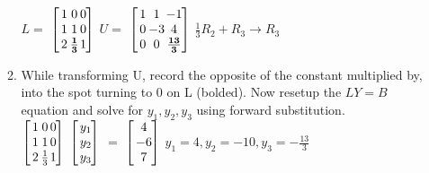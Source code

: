 \documentclass[fontsize=5pt]{scrartcl}
\makeatletter
\newenvironment{tmatrix3}%
{ 
  $\left[\hspace{-3.5pt}\begin{array}{c@{\hspace{1pt}}@{\hspace{1pt}}c@{\hspace{1pt}}c@{\hspace{3pt}}}
}%
{
   \end{array}\hspace{-3.5pt}\right]$
}
\newenvironment{tmatrix1}%
{ 
  $\left[\hspace{-3.5pt}\begin{array}{c@{\hspace{3pt}}}
}%
{
   \end{array}\hspace{-3.5pt}\right]$
}
\makeatother
\begin{document}
\begin{multicols}{3}
\begin{enumerate}
\begin{enumerate}
            $L=$ %
            \begin{tmatrix3}
             1 & 0 & 0 \\
             1 & 1 & 0 \\ 
             2 & \mathbf{\frac{1}{3}} & 1 \\
            \end{tmatrix3}%
            \vline\hspace{2pt}%
            $U=$
            \begin{tmatrix3}
              1 & 1  & -1 \\
              0 & -3 & 4  \\
              0 & 0  & \mathbf{\frac{13}{3}} 
            \end{tmatrix3}%
             $\frac{1}{3}R_2+R_3\rightarrow R_3$ \\
             
           \item While transforming U, record the opposite of the constant multiplied by, into the spot turning to 0 on L (bolded).
                 Now resetup the $LY=B$ equation and solve for $y_1, y_2, y_3$ using forward substitution. \\
              \begin{tmatrix3}
                1 & 0 & 0 \\
                1 & 1 & 0 \\ 
                2 & \frac{1}{3} & 1 \\
              \end{tmatrix3}%
              \begin{tmatrix1}
                y_1\\
                y_2\\
                y_3
              \end{tmatrix1}%
              $=$%
              \begin{tmatrix1}
                4\\
                -6\\
                7
              \end{tmatrix1}\Rightarrow%
              $y_1=4,y_2=-10, y_3=-\frac{13}{3}$
              

\end{enumerate}
\end{enumerate}
\end{multicols}
\end{document}
